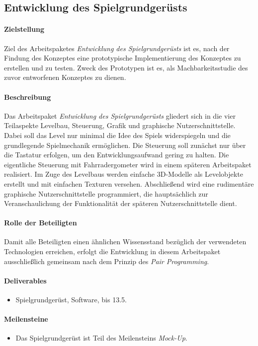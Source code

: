 \subsection{Entwicklung des Spielgrundgerüsts}
\label{ap4}

\paragraph{Zielstellung}\noindent
Ziel des Arbeitspaketes \textit{Entwicklung des Spielgrundgerüsts} ist es, nach der Findung des Konzeptes eine prototypische Implementierung des Konzeptes zu erstellen und zu testen. Zweck des Prototypen ist es, als Machbarkeitsstudie des zuvor entworfenen Konzeptes zu dienen.

\paragraph{Beschreibung}\noindent
Das Arbeitspaket \textit{Entwicklung des Spielgrundgerüsts} gliedert sich in die vier Teilaspekte Levelbau, Steuerung, Grafik und graphische Nutzerschnittstelle.\\
Dabei soll das Level nur minimal die Idee des Spiels widerspiegeln und die grundlegende Spielmechanik ermöglichen. Die Steuerung soll zunächst nur über die Tastatur erfolgen, um den Entwicklungsaufwand gering zu halten. Die eigentliche Steuerung mit Fahrradergometer wird in einem späteren Arbeitspaket realisiert. Im Zuge des Levelbaus werden einfache 3D-Modelle als Levelobjekte erstellt und mit einfachen Texturen versehen. Abschließend wird eine rudimentäre graphische Nutzerschnittstelle programmiert, die hauptsächlich zur Veranschaulichung der Funktionalität der späteren Nutzerschnittstelle dient.

\paragraph{Rolle der Beteiligten}\noindent
Damit alle Beteiligten einen ähnlichen Wissensstand bezüglich der verwendeten Technologien erreichen, erfolgt die Entwicklung in diesem Arbeitspaket ausschließlich gemeinsam nach dem Prinzip des \textit{Pair Programming}\cite[S. 42ff]{xp}.

\paragraph{Deliverables}\noindent
\begin{itemize}
\item Spielgrundgerüst, Software, bis 13.5.
\end{itemize}

\paragraph{Meilensteine}\noindent
\begin{itemize}
\item Das Spielgrundgerüst ist Teil des Meilensteins \textit{Mock-Up}.
\end{itemize}
